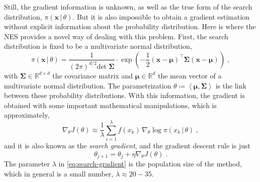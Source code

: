 Still, the gradient information is unknown, as well as the true form of the search distribution, \(\pi (\bm{x} \, \vert \, \theta)\). But it is also impossible to obtain a gradient estimation without explicit information about the probability distribution. Here is where the NES provides a novel way of dealing with this problem. First, the search distribution is fixed to be a multivariate normal distribution,
\begin{equation}
    \pi (\bm{x} \, \vert \, \theta) = 
    \frac{1}{{(2 \pi)}^{d/2} \text{det} \; \bm{\Sigma} } 
    \cdot
    \exp{\left(- \frac{1}{2} {\left(\bm{x} - \bm{\mu}\right)}^{\top}
    \bm{\Sigma}
    \left(\bm{x} - \bm{\mu}\right) \right)}
    \; ,
    \label{eq:multivariate-gaussian}
\end{equation}
with \(\bm{\Sigma} \in \mathbb{R}^{d \times d}\) the covariance matrix and 
\(\bm{\mu} \in \mathbb{R}^{d}\) 
the mean vector of a multivariate normal distribution. The parametrization 
\(\theta \coloneqq \left\langle \bm{\mu}, \bm{\Sigma} \right\rangle\) is the link between 
these probability distributions. With this information, the gradient is obtained with some important mathematical manipulations, which is approximately,
\begin{equation}
    \nabla_{\theta} J(\theta) \approx \frac{1}{\lambda} \sum_{i=1}^{\lambda}
    f(x_k) \, \nabla_{\theta} \log{\pi(x_k \, \vert \, \theta)}
    \; ,
    \label{eq:search-gradient}
\end{equation}
and it is also known as the \emph{search gradient}, and the gradient descent rule is just
\begin{equation*}
    \theta_{j + 1} = \theta_{j} + \eta \nabla_{\theta} J(\theta)
    \; .
\end{equation*}
The parameter \(\lambda\) in \autoref{eq:search-gradient} is the population size of the 
method, which in general is a small number, \(\lambda \approx 20 - 35\).

